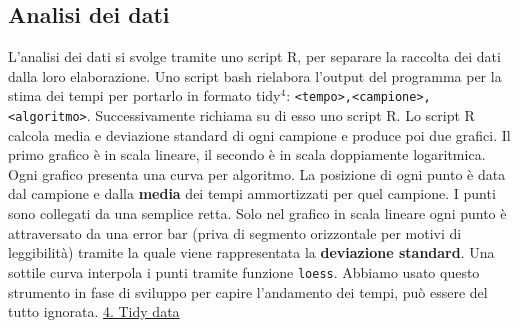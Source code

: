 \documentclass{article}
\begin{document}
\subsection{Analisi dei dati}
L'analisi dei dati si svolge tramite uno script R, per separare la raccolta dei dati dalla loro elaborazione.
\newline
\newline
Uno script bash rielabora l'output del programma per la stima dei tempi per portarlo in formato tidy$^4$:
\newline
\texttt{<tempo>,<campione>,<algoritmo>}.
\newline
\newline
Successivamente richiama su di esso uno script R.
\newline
\newline
Lo script R calcola media e deviazione standard di ogni campione e produce poi due grafici.
\newline
Il primo grafico è in scala lineare, il secondo è in scala doppiamente logaritmica.
\newline
Ogni grafico presenta una curva per algoritmo.
\newline
\newline
La posizione di ogni punto è data dal campione e dalla \textbf{media} dei tempi ammortizzati per quel campione.
\newline
I punti sono collegati da una semplice retta.
\newline
\newline
Solo nel grafico in scala lineare ogni punto è attraversato da una error bar (priva di segmento orizzontale per motivi di leggibilità) tramite la quale viene rappresentata la \textbf{deviazione standard}.
\newline
\newline
Una sottile curva interpola i punti tramite funzione \texttt{loess}.
\newline
Abbiamo usato questo strumento in fase di sviluppo per capire l'andamento dei tempi, può essere del tutto ignorata.
\newline
\newline
\newline
\newline
\newline
\newline
\href{https://vita.had.co.nz/papers/tidy-data.html}{4. Tidy data}

\newpage
\end{document}
